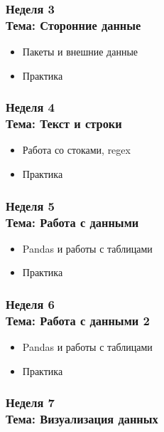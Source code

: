 \documentclass[a4paper,11pt]{article}
\begin{document}
\subsubsection{Неделя 3\\ Тема: Сторонние данные}

\begin{itemize}
    \item  Пакеты и внешние данные
    \item  Практика
\end{itemize}

\subsubsection{Неделя 4\\ Тема: Текст и строки}

\begin{itemize}
    \item Работа со стоками, regex
    \item Практика
\end{itemize}

\subsubsection{Неделя 5\\ Тема: Работа с данными}

\begin{itemize}
    \item Pandas и работы с таблицами
    \item Практика
\end{itemize}

\subsubsection{Неделя 6\\ Тема: Работа с данными 2}

\begin{itemize}
    \item Pandas и работы с таблицами
    \item Практика
\end{itemize}

\subsubsection{Неделя 7\\ Тема: Визуализация данных}
\end{document}
